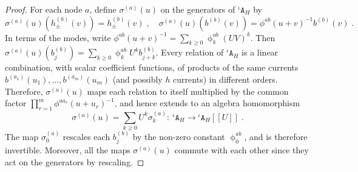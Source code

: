 \documentclass[11pt]{article}
\numberwithin{equation}{section}
\numberwithin{figure}{section}
\numberwithin{table}{section}
\begin{document}
\begin{proof}
	For each node $a$, define $\sigma^{(a)}(u)$ on the generators of ${}^\iota\mathtt{A}_H$ by
	\begin{equation}
		\sigma^{(a)}(u)\left(h^{(b)}_\pm(v)\right)=h^{(b)}_\pm(v)\;,\quad\sigma^{(a)}(u)\left(b^{(b)}(v)\right)=\phi^{ab}(u+v)^{-1}b^{(b)}(v)\;.
	\end{equation}
	In terms of the modes, write $\phi^{ab}(u+v)^{-1}=\sum\limits_{k\geq0}\upphi^{ab}_k(UV)^k$. Then $\sigma^{(a)}(u)\left(b^{(b)}_j\right)=\sum\limits_{k\geq0}\upphi^{ab}_kU^kb^{(b)}_{j+k}$. Every relation of ${}^\iota\mathtt{A}_H$ is a linear combination, with scalar coefficient functions, of products of the same currents $b^{(a_1)}(u_1),\dots,b^{(a_m)}(u_m)$ (and possibly $h$ currents) in different orders. Therefore, $\sigma^{(a)}(u)$ maps each relation to itself multiplied by the common factor $\prod\limits_{r=1}^m\phi^{aa_r}(u+u_r)^{-1}$, and hence extends to an algebra homomorphism
	\begin{equation}
		\sigma^{(a)}(u)=\sum_{k\geq0}U^k\sigma^{(a)}_k:~{}^\iota\mathtt{A}_H\rightarrow{}^\iota\mathtt{A}_H[\![U]\!]\;.
	\end{equation}
	The map $\sigma^{(a)}_0$ rescales each $b^{(b)}_j$ by the non-zero constant $\upphi^{ab}_0$, and is therefore invertible. Moreover, all the maps $\sigma^{(a)}(u)$ commute with each other since they act on the generators by rescaling.
	

\end{proof}
\end{document}
